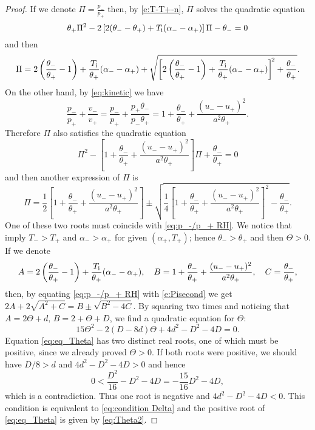 \documentclass[10pt,a4paper]{article}
\numberwithin{equation}{section}
\newcommand{\Ti}{T_{\rm i}}
\begin{document}
\begin{proof}


If we denote $\Pi = \frac{p_{-}}{p_{+}}$ then, by \eqref{e:T-T+-n}, $\Pi$ solves the quadratic equation \cite[(5.15)]{Asakura-Corli_ionized}
$$
   \theta_+\Pi^2 - 2\left[2(\theta_- - \theta_+) + \Ti(\alpha_- - \alpha_+)\right]\Pi - \theta_- = 0
$$
and then \cite[(5.16)]{Asakura-Corli_ionized}
\begin{equation}
  \Pi = 2\left(\frac{\theta_-}{\theta_+} - 1\right) + \frac{\Ti}{\theta_+}(\alpha_- - \alpha_+) + \sqrt{\left[2\left(\frac{\theta_-}{\theta_+} - 1\right) + \frac{\Ti}{\theta_+}(\alpha_- - \alpha_+)\right]^{\!2} + \frac{\theta_-}{\theta_+}}. \label{eq:p_-/p_+ RH}
\end{equation}
On the other hand, by \eqref{eq:kinetic} we have
$$
\frac{p_{-}}{p_{+}} + \frac{v_{-}}{v_{+}} = \frac{p_{-}}{p_{+}} + \frac{p_{+}\theta_-}{p_{-}\theta_+}= 1 +  \frac{\theta_-}{\theta_+} +   \frac{ (u_- - u_+)^2}{a^2\theta_+}. 
$$
Therefore $\Pi$ also satisfies the quadratic equation
$$
 \Pi^2 - \left[1 +  \frac{\theta_-}{\theta_+} +   \frac{ (u_- - u_+)^2}{a^2\theta_+} \right]\Pi + \frac{\theta_-}{\theta_+} = 0
$$
and then another expression of $\Pi$ is 
\begin{equation}\label{e:Pisecond}
    \Pi = \frac{1}{2}\left[1 +  \frac{\theta_-}{\theta_+} +   \frac{ (u_- - u_+)^2}{a^2\theta_+} \right] \pm \sqrt{\frac{1}{4}\left[1 +  \frac{\theta_-}{\theta_+} +   \frac{ (u_- - u_+)^2}{a^2\theta_+} \right]^{\! 2} -  \frac{\theta_-}{\theta_+}}.
\end{equation}
One of these two roots must coincide with \eqref{eq:p_-/p_+ RH}.
We notice that \cite[Prop. 5.2 and Th. 5.1]{Asakura-Corli_ionized} imply $T_{-}>T_{+}$ and $\alpha_->\alpha_+$ for given $(\alpha_+,T_{+})$; hence $\theta_->\theta_+$ and then $\Theta>0$. If we denote
$$
    A = 2\left(\frac{\theta_-}{\theta_+} - 1\right) + \frac{\Ti}{\theta_+}(\alpha_- - \alpha_+), \quad
    B = 1 +  \frac{\theta_-}{\theta_+} +   \frac{ (u_- - u_+)^2}{a^2\theta_+}, \quad
    C = \frac{\theta_-}{\theta_+},
$$ 
then, by equating \eqref{eq:p_-/p_+ RH} with \eqref{e:Pisecond} we get
$
   2A + 2\sqrt{A^2 + C} = B \pm\sqrt{B^2 - 4C}.
$
By squaring two times and noticing that $A = 2\Theta + d,\, B = 2 + \Theta + D$, we find a quadratic equation for $\Theta:$
\begin{equation}\label{eq:eq_Theta}
  15 \Theta^2 - 2(D - 8d) \Theta + 4d^2 - D^2 - 4D = 0.
\end{equation}
Equation \eqref{eq:eq_Theta} has two distinct real roots, one of which must be positive, since we already proved $\Theta>0$. If both roots were positive, we should have $D/8 > d$ and $4d^2 - D^2 - 4D > 0$
and hence
$$
   0 < \frac{D^2}{16} - D^2 - 4D = - \frac{15}{16} D^2 - 4D, 
$$
which is a contradiction. Thus one root is negative and $4d^2 - D^2 - 4D < 0.$ This condition is equivalent to \eqref{eq:condition Delta} and the positive root of \eqref{eq:eq_Theta} is given by \eqref{eq:Theta2}.
\end{proof}
\end{document}
